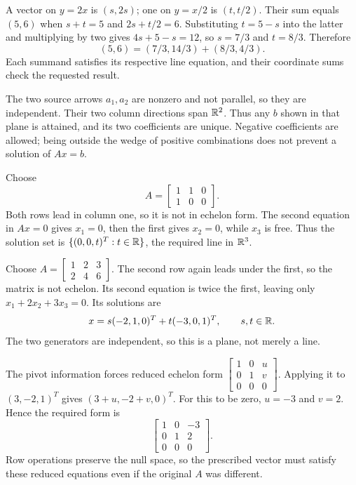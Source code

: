 A vector on $y=2x$ is $(s,2s)$; one on $y=x/2$ is $(t,t/2)$.
Their sum equals $(5,6)$ when
$s+t=5$ and $2s+t/2=6$. Substituting $t=5-s$ into the latter
and multiplying by two gives $4s+5-s=12$, so $s=7/3$ and
$t=8/3$. Therefore
\[
 (5,6)=(7/3,14/3)+(8/3,4/3).
\]
Each summand satisfies its respective line equation, and their
coordinate sums check the requested result.

The two source arrows $a_1,a_2$ are nonzero and not parallel,
so they are independent. Their two column directions span $\mathbb{R}^2$.
Thus any $b$ shown in that plane is attained, and its two coefficients
are unique. Negative coefficients are allowed; being outside the wedge
of positive combinations does not prevent a solution of $Ax=b$.

Choose
\[
 A=\begin{bmatrix}1&1&0\\1&0&0\end{bmatrix}.
\]
Both rows lead in column one, so it is not in echelon form.
The second equation in $Ax=0$ gives $x_1=0$, then the first
gives $x_2=0$, while $x_3$ is free. Thus the solution set is
$\{(0,0,t)^T:t\in\mathbb{R}\}$, the required line in $\mathbb{R}^3$.

Choose $A=\begin{bmatrix}1&2&3\\2&4&6\end{bmatrix}$.
The second row again leads under the first, so the matrix is not
echelon. Its second equation is twice the first, leaving only
$x_1+2x_2+3x_3=0$. Its solutions are
\[
 x=s(-2,1,0)^T+t(-3,0,1)^T,\qquad s,t\in\mathbb{R}.
\]
The two generators are independent, so this is a plane, not merely a line.

The pivot information forces reduced echelon form
$\begin{bmatrix}1&0&u\\0&1&v\\0&0&0\end{bmatrix}$.
Applying it to $(3,-2,1)^T$ gives $(3+u,-2+v,0)^T$.
For this to be zero, $u=-3$ and $v=2$. Hence the required form is
\[
 \begin{bmatrix}1&0&-3\\0&1&2\\0&0&0\end{bmatrix}.
\]
Row operations preserve the null space, so the prescribed vector must
satisfy these reduced equations even if the original $A$ was different.

